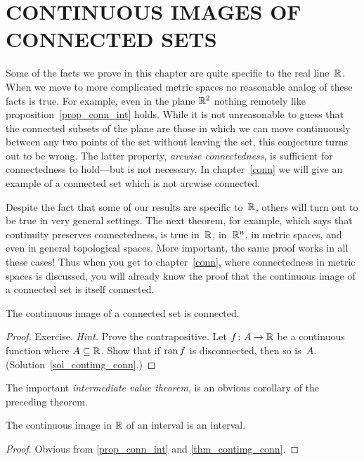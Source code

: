 \section{CONTINUOUS IMAGES OF CONNECTED SETS} Some of the facts we prove in this chapter are
quite specific to the real line~$\mathbb{R}$.  When we move to more complicated metric spaces no
reasonable analog of these facts is true. For example, even in the plane $\mathbb{R}^2$ nothing
remotely like proposition~\ref{prop_conn_int} holds. While it is not unreasonable to guess
that the connected subsets of the plane are those in which we can move continuously between
any two points of the set without leaving the set, this conjecture turns out to be wrong.  The
latter property, \emph{arcwise connectedness}, is sufficient for connectedness to hold---but
is not necessary.  In chapter~\ref{conn} we will give an example of a connected set which is
not arcwise connected.

Despite the fact that some of our results are specific to~$\mathbb{R}$, others will turn out to be
true in very general settings.  The next theorem, for example, which says that continuity
preserves connectedness, is true in~$\mathbb{R}$, in~$\mathbb{R}^n$, in metric spaces, and even in general
topological spaces.  More important, the same proof works in all these cases!  Thus when you
get to chapter~\ref{conn}, where connectedness in metric spaces is discussed,  you will
already know the proof that the continuous image of a connected set is itself connected.

\begin{thm}\label{thm_contimg_conn} The continuous image of a connected set is connected.
\end{thm}

\begin{proof} Exercise. \emph{Hint.}  Prove the contrapositive.  Let $f\colon A \rightarrow \mathbb{R}$ be
a continuous function where $A \subseteq \mathbb{R}$.  Show that if $\operatorname{ran} f$ is disconnected, then so
is~$A$.  (Solution~\ref{sol_contimg_conn}.)   \ns
\end{proof}

The important \emph{intermediate value theorem}, is an obvious corollary of the preceding
theorem.

\begin{thm}\label{thm_ivt1} The continuous
image in $\mathbb{R}$ of an interval is an interval.
\end{thm}

\begin{proof} Obvious from \ref{prop_conn_int} and \ref{thm_contimg_conn}.
\end{proof}

